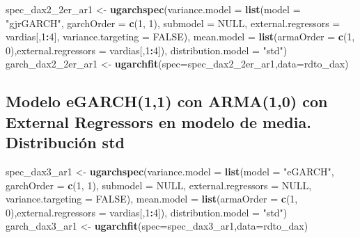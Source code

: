 \documentclass[
  11pt,
]{article}
\newenvironment{Shaded}{\begin{snugshade}}{\end{snugshade}}
\newcommand{\DataTypeTok}[1]{\textcolor[rgb]{0.13,0.29,0.53}{#1}}
\newcommand{\DecValTok}[1]{\textcolor[rgb]{0.00,0.00,0.81}{#1}}
\newcommand{\KeywordTok}[1]{\textcolor[rgb]{0.13,0.29,0.53}{\textbf{#1}}}
\newcommand{\NormalTok}[1]{#1}
\newcommand{\OperatorTok}[1]{\textcolor[rgb]{0.81,0.36,0.00}{\textbf{#1}}}
\newcommand{\OtherTok}[1]{\textcolor[rgb]{0.56,0.35,0.01}{#1}}
\newcommand{\StringTok}[1]{\textcolor[rgb]{0.31,0.60,0.02}{#1}}
\begin{document}
\begin{Shaded}
\begin{Highlighting}[]
\NormalTok{spec_dax2_2er_ar1 <-}\StringTok{ }\KeywordTok{ugarchspec}\NormalTok{(}\DataTypeTok{variance.model =} \KeywordTok{list}\NormalTok{(}\DataTypeTok{model =} \StringTok{"gjrGARCH"}\NormalTok{, }\DataTypeTok{garchOrder =} \KeywordTok{c}\NormalTok{(}\DecValTok{1}\NormalTok{, }\DecValTok{1}\NormalTok{), }
                    \DataTypeTok{submodel =} \OtherTok{NULL}\NormalTok{, }\DataTypeTok{external.regressors  =}\NormalTok{ vardias[,}\DecValTok{1}\OperatorTok{:}\DecValTok{4}\NormalTok{], }\DataTypeTok{variance.targeting =} \OtherTok{FALSE}\NormalTok{), }
                    \DataTypeTok{mean.model =} \KeywordTok{list}\NormalTok{(}\DataTypeTok{armaOrder =} \KeywordTok{c}\NormalTok{(}\DecValTok{1}\NormalTok{, }\DecValTok{0}\NormalTok{),}\DataTypeTok{external.regressors =}\NormalTok{ vardias[,}\DecValTok{1}\OperatorTok{:}\DecValTok{4}\NormalTok{]),}
               \DataTypeTok{distribution.model =} \StringTok{"std"}\NormalTok{)}
\NormalTok{garch_dax2_2er_ar1 <-}\StringTok{ }\KeywordTok{ugarchfit}\NormalTok{(}\DataTypeTok{spec=}\NormalTok{spec_dax2_2er_ar1,}\DataTypeTok{data=}\NormalTok{rdto_dax)}
\end{Highlighting}
\end{Shaded}

\hypertarget{modelo-egarch11-con-arma10-con-external-regressors-en-modelo-de-media.-distribuciuxf3n-std}{%
\subsection{Modelo eGARCH(1,1) con ARMA(1,0) con External Regressors en
modelo de media. Distribución
std}\label{modelo-egarch11-con-arma10-con-external-regressors-en-modelo-de-media.-distribuciuxf3n-std}}

\begin{Shaded}
\begin{Highlighting}[]
\NormalTok{spec_dax3_ar1 <-}\StringTok{ }\KeywordTok{ugarchspec}\NormalTok{(}\DataTypeTok{variance.model =} \KeywordTok{list}\NormalTok{(}\DataTypeTok{model =} \StringTok{"eGARCH"}\NormalTok{, }\DataTypeTok{garchOrder =} \KeywordTok{c}\NormalTok{(}\DecValTok{1}\NormalTok{, }\DecValTok{1}\NormalTok{), }
                    \DataTypeTok{submodel =} \OtherTok{NULL}\NormalTok{, }\DataTypeTok{external.regressors =} \OtherTok{NULL}\NormalTok{, }\DataTypeTok{variance.targeting =} \OtherTok{FALSE}\NormalTok{), }
                    \DataTypeTok{mean.model =} \KeywordTok{list}\NormalTok{(}\DataTypeTok{armaOrder =} \KeywordTok{c}\NormalTok{(}\DecValTok{1}\NormalTok{, }\DecValTok{0}\NormalTok{),}\DataTypeTok{external.regressors =}\NormalTok{ vardias[,}\DecValTok{1}\OperatorTok{:}\DecValTok{4}\NormalTok{]),}
               \DataTypeTok{distribution.model =} \StringTok{"std"}\NormalTok{)}
\NormalTok{garch_dax3_ar1 <-}\StringTok{ }\KeywordTok{ugarchfit}\NormalTok{(}\DataTypeTok{spec=}\NormalTok{spec_dax3_ar1,}\DataTypeTok{data=}\NormalTok{rdto_dax)}
\end{Highlighting}
\end{Shaded}
\end{document}
